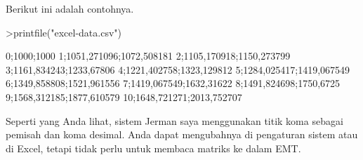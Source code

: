 \documentclass[12pt,arial,letterpaper]{book}
\begin{document}
\begin{eulernootebook}
\begin{eulercomment}
\begin{eulercomment}
\begin{eulernootebook}
\begin{eulercomment}
\begin{eulercomment}
\begin{eulercomment}
\begin{eulercomment}
\begin{eulercomment}
\begin{eulercomment}
\begin{eulercomment}
\begin{eulercomment}
\begin{eulercomment}
\begin{eulercomment}
\begin{eulercomment}
\begin{eulercomment}
\begin{eulercomment}
\begin{eulercomment}
Berikut ini adalah contohnya.
\end{eulercomment}
\begin{eulerprompt}
>printfile("excel-data.csv")
\end{eulerprompt}
\begin{euleroutput}
  0;1000;1000
  1;1051,271096;1072,508181
  2;1105,170918;1150,273799
  3;1161,834243;1233,67806
  4;1221,402758;1323,129812
  5;1284,025417;1419,067549
  6;1349,858808;1521,961556
  7;1419,067549;1632,31622
  8;1491,824698;1750,6725
  9;1568,312185;1877,610579
  10;1648,721271;2013,752707
\end{euleroutput}
\begin{eulercomment}
Seperti yang Anda lihat, sistem Jerman saya menggunakan titik koma
sebagai pemisah dan koma desimal. Anda dapat mengubahnya di pengaturan
sistem atau di Excel, tetapi tidak perlu untuk membaca matriks ke
dalam EMT.


\end{eulercomment}
\end{eulercomment}
\end{eulercomment}
\end{eulercomment}
\end{eulercomment}
\end{eulercomment}
\end{eulercomment}
\end{eulercomment}
\end{eulercomment}
\end{eulercomment}
\end{eulercomment}
\end{eulercomment}
\end{eulercomment}
\end{eulercomment}
\end{eulernootebook}
\end{eulercomment}
\end{eulercomment}
\end{eulernootebook}
\end{document}
